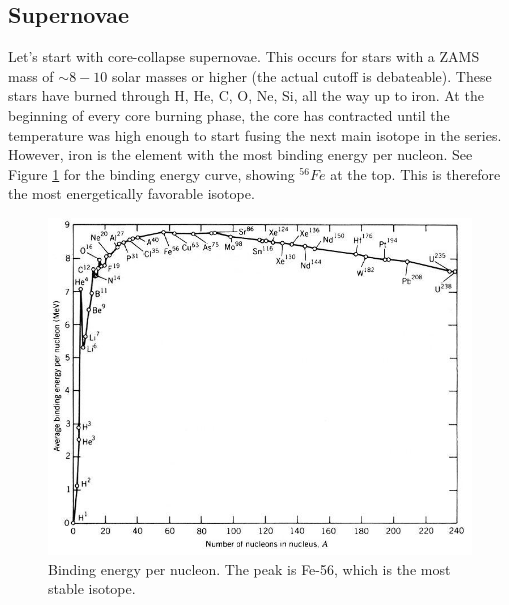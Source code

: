 \subsection{Supernovae}

Let's start with core-collapse supernovae. This occurs for stars with a ZAMS mass of $\sim 8-10$ solar masses or higher (the actual cutoff is debateable). These stars have burned through H, He, C, O, Ne, Si, all the way up to iron. At the beginning of every core burning phase, the core has contracted until the temperature was high enough to start fusing the next main isotope in the series. However, iron is the element with the most binding energy per nucleon. See Figure \ref{f:be} for the binding energy curve, showing $^{56}Fe$ at the top. This is therefore the most energetically favorable isotope.

\begin{figure}[!h]
\begin{center}
\includegraphics[width=\textwidth]{binding_energy.jpg}
\caption{Binding energy per nucleon. The peak is Fe-56, which is the most stable isotope. \label{f:be}}
\end{center}
\end{figure}

